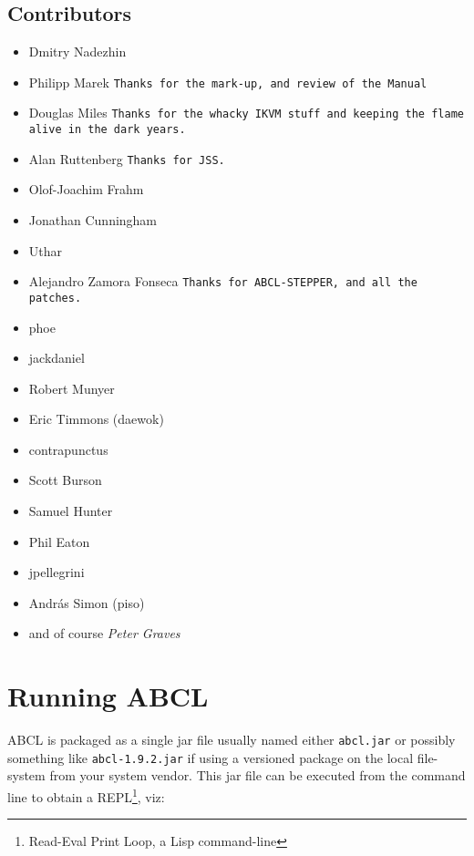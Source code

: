\documentclass[10pt]{book}
\begin{document}
\section{Contributors}

\begin{itemize}
\item Dmitry Nadezhin
\item Philipp Marek \texttt{Thanks for the mark-up, and review of the Manual}
\item Douglas Miles \texttt{Thanks for the whacky IKVM stuff and keeping the flame alive
  in the dark years.}
\item Alan Ruttenberg \texttt{Thanks for JSS.}
\item Olof-Joachim Frahm
\item Jonathan Cunningham
\item Uthar
\item Alejandro Zamora Fonseca \texttt{Thanks for ABCL-STEPPER, and all the patches.}
\item phoe
\item jackdaniel
\item Robert Munyer
\item Eric Timmons (daewok)
\item contrapunctus
\item Scott Burson
\item Samuel Hunter
\item Phil Eaton
\item jpellegrini  

  
\item Andr\'as Simon (piso)
\item and of course \emph{Peter Graves}
\end{itemize}


\chapter{Running ABCL}


\textsc{ABCL} is packaged as a single jar file usually named either
\texttt{abcl.jar} or possibly something like \texttt{abcl-1.9.2.jar} if
using a versioned package on the local file-system from your system
vendor.  This jar file can be executed from the command line to obtain a
\textsc{REPL}\footnote{Read-Eval Print Loop, a Lisp command-line}, viz:


\end{document}
